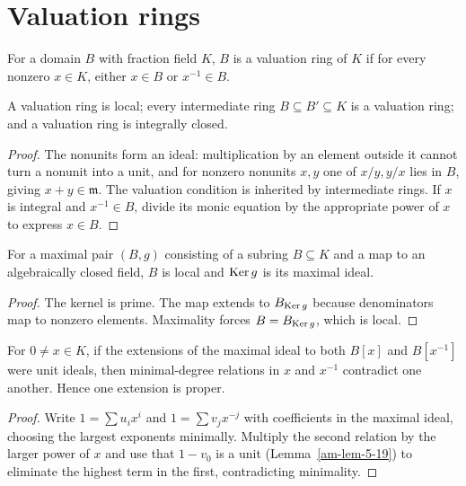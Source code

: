 \section{Valuation rings}
\label{am-ch5-valuations}
\begin{definition}
\label{am-def-valuation-ring}
\uses{}
For a domain $B$ with fraction field $K$, $B$ is a valuation ring of $K$ if for
every nonzero $x\in K$, either $x\in B$ or $x^{-1}\in B$.
\end{definition}
\begin{proposition}
\label{am-prop-5-18}
\uses{}
A valuation ring is local; every intermediate ring $B\subseteq B'\subseteq K$
is a valuation ring; and a valuation ring is integrally closed.
\end{proposition}
\begin{proof}
The nonunits form an ideal: multiplication by an element outside it cannot
turn a nonunit into a unit, and for nonzero nonunits $x,y$ one of $x/y,y/x$
lies in $B$, giving $x+y\in\mathfrak{m}$.  The valuation condition is inherited
by intermediate rings.  If $x$ is integral and $x^{-1}\in B$, divide its monic
equation by the appropriate power of $x$ to express $x\in B$.
\end{proof}
\begin{lemma}
\label{am-lem-5-19}
\uses{}
For a maximal pair $(B,g)$ consisting of a subring $B\subseteq K$ and a map to
an algebraically closed field, $B$ is local and $\operatorname{Ker} g$ is its maximal ideal.
\end{lemma}
\begin{proof}
The kernel is prime.  The map extends to $B_{\operatorname{Ker} g}$ because denominators map
to nonzero elements.  Maximality forces $B=B_{\operatorname{Ker} g}$, which is local.
\end{proof}
\begin{lemma}
\label{am-lem-5-20}
\uses{}
For $0\ne x\in K$, if the extensions of the maximal ideal to both $B[x]$ and
$B[x^{-1}]$ were unit ideals, then minimal-degree relations in $x$ and $x^{-1}$
contradict one another.  Hence one extension is proper.
\end{lemma}
\begin{proof}
Write $1=\sum u_ix^i$ and $1=\sum v_jx^{-j}$ with coefficients in the maximal
ideal, choosing the largest exponents minimally.  Multiply the second relation
by the larger power of $x$ and use that $1-v_0$ is a unit (Lemma~\ref{am-lem-5-19})
to eliminate the highest term in the first, contradicting minimality.
\end{proof}
